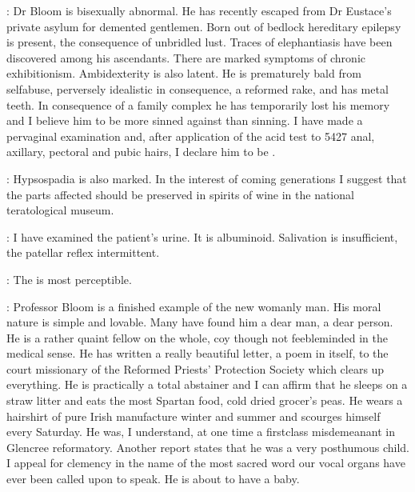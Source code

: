 \DrMulligan:
Dr Bloom is bisexually abnormal.
He has recently escaped from Dr Eustace's
private asylum for demented gentlemen.
Born out of bedlock hereditary epilepsy is present,
the consequence of unbridled lust.
Traces of elephantiasis have been discovered among his ascendants.
There are marked symptoms of chronic exhibitionism.
Ambidexterity is also latent.
He is prematurely bald from selfabuse,
perversely idealistic in consequence,
a reformed rake, and has metal teeth.
In consequence of a family complex
he has temporarily lost his memory
and I believe him to be more sinned against than sinning.
I have made a pervaginal examination
and, after application of the acid test to
5427 anal, axillary, pectoral and pubic hairs,
I declare him to be .


\DrMadden:
Hypsospadia is also marked.
In the interest of coming generations
I suggest that the parts affected should be preserved
in spirits of wine in the national teratological museum.

\DrCrotthers:
I have examined the patient's urine.
It is albuminoid.
Salivation is insufficient, the patellar reflex intermittent.

\DrPunchCostello:
The  is most perceptible.

\DrDixon:
Professor Bloom is a finished example of the new womanly man.
His moral nature is simple and lovable.
Many have found him a dear man, a dear person.
He is a rather quaint fellow on the whole,
coy though not feebleminded in the medical sense.
He has written a really beautiful letter, a poem in itself,
to the court missionary of the Reformed Priests' Protection Society
which clears up everything.
He is practically a total abstainer
and I can affirm that he sleeps on a straw litter
and eats the most Spartan food, cold dried grocer's peas.
He wears a hairshirt of pure Irish manufacture winter and summer
and scourges himself every Saturday.
He was, I understand, at one time
a firstclass misdemeanant in Glencree reformatory.
Another report states that he was a very posthumous child.
I appeal for clemency in the name of
the most sacred word our vocal organs have ever been called upon to speak.
He is about to have a baby.


